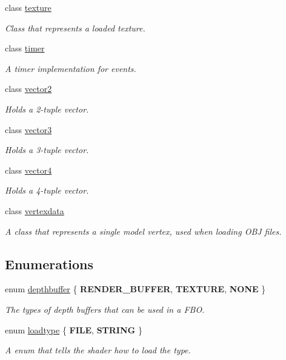 \begin{DoxyCompactItemize}
class \hyperlink{classflounder_1_1texture}{texture}
\begin{DoxyCompactList}\small\item\em Class that represents a loaded texture. \end{DoxyCompactList}\item 
class \hyperlink{classflounder_1_1timer}{timer}
\begin{DoxyCompactList}\small\item\em A timer implementation for events. \end{DoxyCompactList}\item 
class \hyperlink{classflounder_1_1vector2}{vector2}
\begin{DoxyCompactList}\small\item\em Holds a 2-\/tuple vector. \end{DoxyCompactList}\item 
class \hyperlink{classflounder_1_1vector3}{vector3}
\begin{DoxyCompactList}\small\item\em Holds a 3-\/tuple vector. \end{DoxyCompactList}\item 
class \hyperlink{classflounder_1_1vector4}{vector4}
\begin{DoxyCompactList}\small\item\em Holds a 4-\/tuple vector. \end{DoxyCompactList}\item 
class \hyperlink{classflounder_1_1vertexdata}{vertexdata}
\begin{DoxyCompactList}\small\item\em A class that represents a single model vertex, used when loading O\+BJ files. \end{DoxyCompactList}\end{DoxyCompactItemize}
\subsection*{Enumerations}
\begin{DoxyCompactItemize}
\item 
enum \hyperlink{namespaceflounder_aed09c736167e783c910ec9e58479b57c}{depthbuffer} \{ {\bfseries R\+E\+N\+D\+E\+R\+\_\+\+B\+U\+F\+F\+ER}, 
{\bfseries T\+E\+X\+T\+U\+RE}, 
{\bfseries N\+O\+NE}
 \}\begin{DoxyCompactList}\small\item\em The types of depth buffers that can be used in a F\+BO. \end{DoxyCompactList}
\item 
enum \hyperlink{namespaceflounder_a69b4e6ffcd64f6175546ca0942d18565}{loadtype} \{ {\bfseries F\+I\+LE}, 
{\bfseries S\+T\+R\+I\+NG}
 \}\begin{DoxyCompactList}\small\item\em A enum that tells the shader how to load the type. \end{DoxyCompactList}
\end{DoxyCompactItemize}
